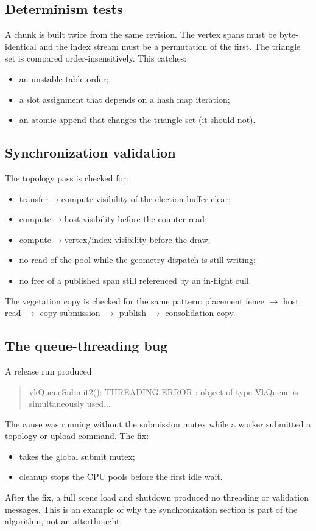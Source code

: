 \subsection{Determinism tests}

A chunk is built twice from the same revision.  The vertex spans must be
byte-identical and the index stream must be a permutation of the first.
The triangle set is compared order-insensitively.  This catches:
\begin{itemize}
\item an unstable table order;
\item a slot assignment that depends on a hash map iteration;
\item an atomic append that changes the triangle set (it should not).
\end{itemize}

\subsection{Synchronization validation}

The topology pass is checked for:
\begin{itemize}
\item transfer$\rightarrow$compute visibility of the election-buffer clear;
\item compute$\rightarrow$host visibility before the counter read;
\item compute$\rightarrow$vertex/index visibility before the draw;
\item no read of the pool while the geometry dispatch is still writing;
\item no free of a published span still referenced by an in-flight cull.
\end{itemize}
The vegetation copy is checked for the same pattern: placement fence
$\rightarrow$ host read $\rightarrow$ copy submission $\rightarrow$
publish $\rightarrow$ consolidation copy.

\subsection{The queue-threading bug}

A release run produced
\begin{quote}\ttfamily\small\raggedright
vkQueueSubmit2(): THREADING ERROR : object of type VkQueue is\\
simultaneously used...
\end{quote}
The cause was  running without the submission
mutex while a worker submitted a topology or upload command.  The fix:
\begin{itemize}
\item {} takes the global submit mutex;
\item cleanup stops the CPU pools before the first idle wait.
\end{itemize}
After the fix, a full scene load and shutdown produced no threading or
validation messages.  This is an example of why the synchronization
section is part of the algorithm, not an afterthought.

